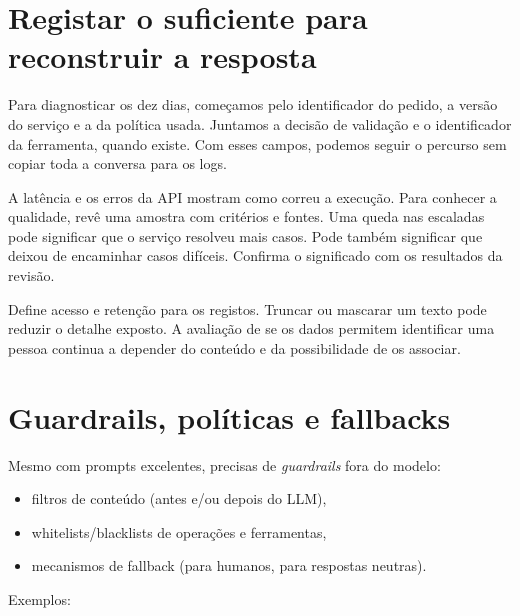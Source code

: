\section{Registar o suficiente para reconstruir a resposta}
Para diagnosticar os dez dias, começamos pelo identificador do pedido, a versão do serviço e a da política usada. Juntamos a decisão de validação e o identificador da ferramenta, quando existe. Com esses campos, podemos seguir o percurso sem copiar toda a conversa para os logs.

A latência e os erros da API mostram como correu a execução. Para conhecer a qualidade, revê uma amostra com critérios e fontes. Uma queda nas escaladas pode significar que o serviço resolveu mais casos. Pode também significar que deixou de encaminhar casos difíceis. Confirma o significado com os resultados da revisão.

Define acesso e retenção para os registos. Truncar ou mascarar um texto pode reduzir o detalhe exposto. A avaliação de se os dados permitem identificar uma pessoa continua a depender do conteúdo e da possibilidade de os associar.

\section{Guardrails, políticas e fallbacks}

Mesmo com prompts excelentes, precisas de \emph{guardrails} fora do modelo:

\begin{itemize}[leftmargin=*]
\item filtros de conteúdo (antes e/ou depois do LLM),
\item whitelists/blacklists de operações e ferramentas,
\item mecanismos de fallback (para humanos, para respostas neutras).
\end{itemize}

Exemplos:

